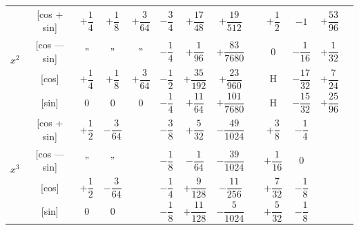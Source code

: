 \documentclass[11pt,a4paper]{book}
\begin{document}
{{\begin{center}
\begin{tabular}{|c|c|c|c|c|c|c|c|c|c|c|c|c|}
\hline
\multirow{4}{*}{$x^2$} & [cos + sin] & $+\dfrac{1}{4}$ & $+\dfrac{1}{8}$ & $+\dfrac{3}{64}$ & $-\dfrac{3}{4}$ & $+\dfrac{17}{48}$ & $+\dfrac{19}{512}$ & & $+\dfrac{1}{2}$ & $-1$ & $+\dfrac{53}{96}$ \\
& [cos --- sin] & $"$ & $"$ & $"$ & $-\dfrac{1}{4}$ & $+\dfrac{1}{96}$ & $+\dfrac{83}{7680}$ & & $0$ & $-\dfrac{1}{16}$ & $+\dfrac{1}{32}$ \\
& [cos] & $+\dfrac{1}{4}$ & $+\dfrac{1}{8}$ & $+\dfrac{3}{64}$ & $-\dfrac{1}{2}$ & $+\dfrac{35}{192}$ & $+\dfrac{23}{960}$ & & H & $-\dfrac{17}{32}$ & $+\dfrac{7}{24}$ \\
& [sin] & $0$ & $0$ & $0$ & $-\dfrac{1}{4}$ & $+\dfrac{11}{64}$ & $+\dfrac{101}{7680}$ & & H & $-\dfrac{15}{32}$ & $+\dfrac{25}{96}$ \\
\hline
\multirow{4}{*}{$x^3$} & [cos + sin] & $+\dfrac{1}{2}$ & $-\dfrac{3}{64}$ & & $-\dfrac{3}{8}$ & $+\dfrac{5}{32}$ & $-\dfrac{49}{1024}$ & & $+\dfrac{3}{8}$ & $-\dfrac{1}{4}$ \\
& [cos --- sin] & $"$ & $"$ & & $-\dfrac{1}{8}$ & $-\dfrac{1}{64}$ & $-\dfrac{39}{1024}$ & & $+\dfrac{1}{16}$ & $0$ \\
& [cos] & $+\dfrac{1}{2}$ & $-\dfrac{3}{64}$ & & $-\dfrac{1}{4}$ & $+\dfrac{9}{128}$ & $-\dfrac{11}{256}$ & & $+\dfrac{7}{32}$ & $-\dfrac{1}{8}$ \\
& [sin] & $0$ & $0$ & & $-\dfrac{1}{8}$ & $+\dfrac{11}{128}$ & $-\dfrac{5}{1024}$ & & $+\dfrac{5}{32}$ & $-\dfrac{1}{8}$ \\
\hline
\end{tabular}
\end{center}

\newpage


}}
\end{document}
